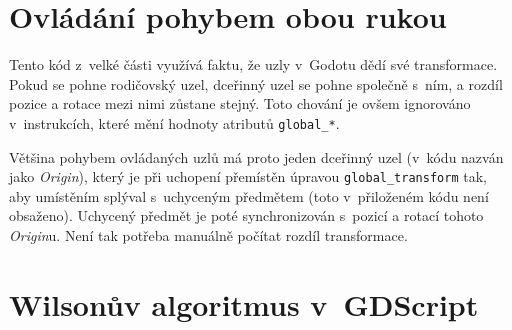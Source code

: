 \documentclass[12pt]{report}
\begin{document}
\chapter{Ovládání pohybem obou rukou}\label{apx_gripped_object_transformation}
Tento kód z~velké části využívá faktu, že uzly v~Godotu dědí své transformace. Pokud se pohne rodičovský uzel, dceřinný uzel se pohne společně s~ním, a rozdíl pozice a rotace mezi nimi zůstane stejný. Toto chování je ovšem ignorováno v~instrukcích, které mění hodnoty atributů \texttt{global\_*}.

Většina pohybem ovládaných uzlů má proto jeden dceřinný uzel (v~kódu nazván jako \textit{Origin}), který je při uchopení přemístěn úpravou \texttt{global\_transform} tak, aby umístěním splýval s~uchyceným předmětem (toto v~přiloženém kódu není obsaženo). Uchycený předmět je poté synchronizován s~pozicí a rotací tohoto \textit{Origin}u. Není tak potřeba manuálně počítat rozdíl transformace.



\chapter{Wilsonův algoritmus v~GDScript}\label{apx_mazegen}

\end{document}
